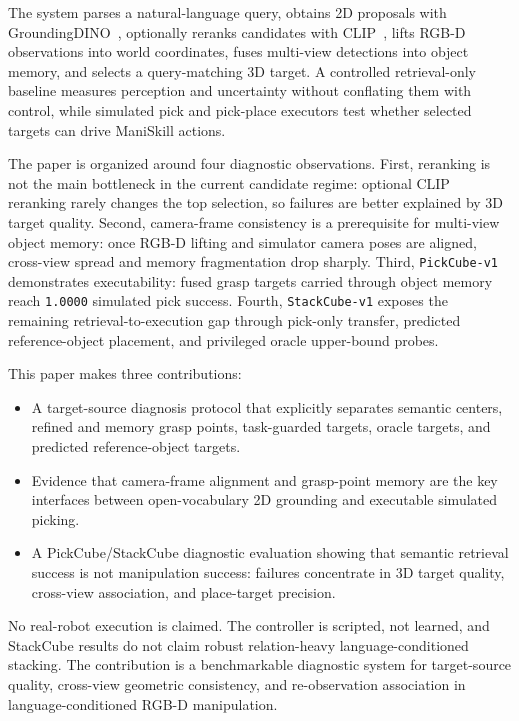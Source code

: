 \documentclass[conference]{IEEEtran}
\begin{document}
The system parses a natural-language query, obtains 2D proposals with
GroundingDINO~\cite{liu2023groundingdino}, optionally reranks candidates with
CLIP~\cite{radford2021learning}, lifts RGB-D observations into world
coordinates, fuses multi-view detections into object memory, and selects a
query-matching 3D target. A controlled retrieval-only baseline measures
perception and uncertainty without conflating them with control, while
simulated pick and pick-place executors test whether selected targets can drive
ManiSkill actions.

The paper is organized around four diagnostic observations. First, reranking is
not the main bottleneck in the current candidate regime: optional CLIP
reranking rarely changes the top selection, so failures are better explained by
3D target quality. Second, camera-frame consistency is a prerequisite for
multi-view object memory: once RGB-D lifting and simulator camera poses are
aligned, cross-view spread and memory fragmentation drop sharply. Third,
\texttt{PickCube-v1} demonstrates executability: fused grasp targets carried
through object memory reach \texttt{1.0000} simulated pick success. Fourth,
\texttt{StackCube-v1} exposes the remaining retrieval-to-execution gap through
pick-only transfer, predicted reference-object placement, and privileged
oracle upper-bound probes.

This paper makes three contributions:
\begin{itemize}
\item A target-source diagnosis protocol that explicitly separates semantic
centers, refined and memory grasp points, task-guarded targets, oracle targets,
and predicted reference-object targets.
\item Evidence that camera-frame alignment and grasp-point memory are the key
interfaces between open-vocabulary 2D grounding and executable simulated
picking.
\item A PickCube/StackCube diagnostic evaluation showing that semantic
retrieval success is not manipulation success: failures concentrate in 3D
target quality, cross-view association, and place-target precision.
\end{itemize}

No real-robot execution is claimed. The controller is scripted, not learned,
and StackCube results do not claim robust relation-heavy language-conditioned
stacking. The contribution is a benchmarkable diagnostic system for
target-source quality, cross-view geometric consistency, and re-observation
association in language-conditioned RGB-D manipulation.
\end{document}
